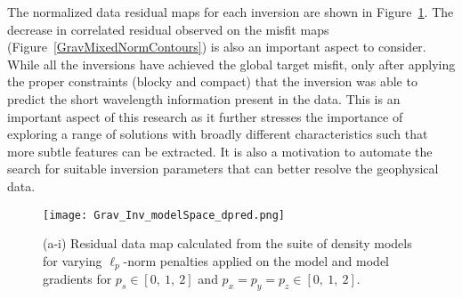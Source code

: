 The normalized data residual maps for each inversion are shown in Figure~\ref{GravMixedNorms_dpred}.
The decrease in correlated residual observed on the misfit maps (Figure~\ref{GravMixedNormContours}) is also an important aspect to consider. While all the inversions have achieved the global target misfit, only after applying the proper constraints (blocky and compact) that the inversion was able to predict the short wavelength information present in the data. This is an important aspect of this research as it further stresses the importance of exploring a range of solutions with broadly different characteristics such that more subtle features can be extracted. It is also a motivation to automate the search for suitable inversion parameters that can better resolve the geophysical data.
\begin{figure}
\texttt{[image: Grav\_Inv\_modelSpace\_dpred.png]}
\caption{(a-i) Residual data map calculated from the suite of density models for varying $\ell_p$-norm penalties applied on the model and model gradients for $p_s\in[0,\:1,\: 2]$ and $p_{x}=p_{y}=p_{z}\in[0,\:1,\: 2]$.
}
\label{GravMixedNorms_dpred}
\end{figure}



\endinput



